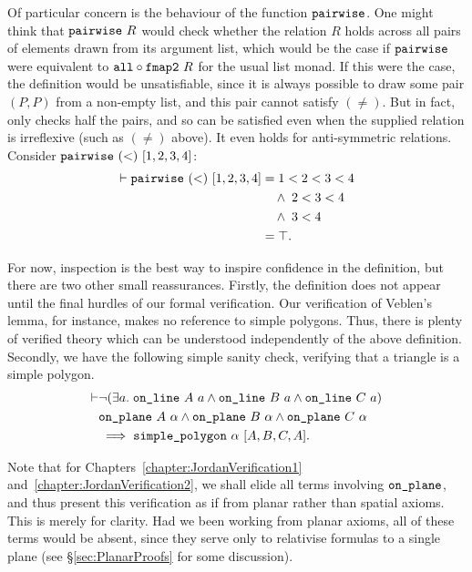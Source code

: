 Of particular concern is the behaviour of the function $\texttt{pairwise}$. One might think that $\texttt{pairwise}\ R$ would check whether the relation $R$ holds across all pairs of elements drawn from its argument list, which would be the case if $\texttt{pairwise}$ were equivalent to $\texttt{all} \circ \texttt{fmap2}\ R$ for the usual list monad. If this were the case, the definition would be unsatisfiable, since it is always possible to draw some pair $(P,P)$ from a non-empty list, and this pair cannot satisfy $(\neq)$. But in fact,  only checks half the pairs, and so can be satisfied even when the supplied relation is irreflexive (such as $(\neq)$ above). It even holds for anti-symmetric relations. Consider $\texttt{pairwise}\ (<)\ [1,2,3,4]$:
\begin{align*}
  \vdash\texttt{pairwise}\ (<)\ [1,2,3,4] &= 1 < 2 < 3 < 4 \\
  &\quad\wedge\; 2 < 3 < 4 \\
  &\quad\wedge\; 3 < 4\\
  & = \top.
\end{align*}

For now, inspection is the best way to inspire confidence in the definition, but there are two other small reassurances. Firstly, the definition does not appear until the final hurdles of our formal verification. Our verification of Veblen's lemma, for instance, makes no reference to simple polygons. Thus, there is plenty of verified theory which can be understood independently of the above definition. Secondly, we have the following simple sanity check, verifying that a triangle is a simple polygon.
\begin{equation*}
  \begin{split}
    \vdash&\Triangle{a}{A}{B}{C}\\
    &\code{on\_plane}\ A\ \alpha\wedge\code{on\_plane}\ B\ \alpha\wedge\code{on\_plane}\ C\ \alpha\\
    &\implies \code{simple\_polygon}\ \alpha\ [A,B,C,A].
  \end{split}
\end{equation*}

Note that for Chapters~\ref{chapter:JordanVerification1} and~\ref{chapter:JordanVerification2}, we shall elide all terms involving $\texttt{on\_plane}$, and thus present this verification as if from planar rather than spatial axioms. This is merely for clarity. Had we been working from planar axioms, all of these terms would be absent, since they serve only to relativise formulas to a single plane (see \S\ref{sec:PlanarProofs} for some discussion).

